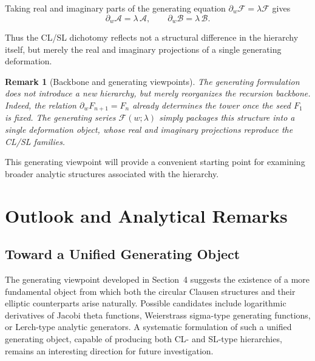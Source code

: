 \documentclass[11pt]{article}
\newtheorem{remark}{Remark}
\begin{document}
Taking real and imaginary parts of the generating equation
\(
\partial_w \mathcal{F}=\lambda \mathcal{F}
\)
gives
\begin{equation}\label{eq:gen-CLSL-ode}
\partial_w \mathcal{A}
=
\lambda\,\mathcal{A},
\qquad
\partial_w \mathcal{B}
=
\lambda\,\mathcal{B}.
\end{equation}

\medskip

Thus the CL/SL dichotomy reflects not a structural difference
in the hierarchy itself, but merely the real and imaginary
projections of a single generating deformation.


\begin{remark}[Backbone and generating viewpoints]
The generating formulation does not introduce a new hierarchy,
but merely reorganizes the recursion backbone.
Indeed, the relation $\partial_w F_{n+1}=F_n$ already determines
the tower once the seed $F_1$ is fixed.
The generating series $\mathcal{F}(w;\lambda)$ simply packages this
structure into a single deformation object,
whose real and imaginary projections reproduce the CL/SL families.
\end{remark}

\medskip

This generating viewpoint will provide a convenient starting point
for examining broader analytic structures associated with the hierarchy.


\section{Outlook and Analytical Remarks}

\subsection{Toward a Unified Generating Object}

The generating viewpoint developed in Section~4 suggests
the existence of a more fundamental object from which both
the circular Clausen structures and their elliptic
counterparts arise naturally.
Possible candidates include logarithmic derivatives of
Jacobi theta functions, Weierstrass sigma-type generating
functions, or Lerch-type analytic generators.
A systematic formulation of such a unified generating
object, capable of producing both CL- and SL-type
hierarchies, remains an interesting direction for future
investigation.
\end{document}
